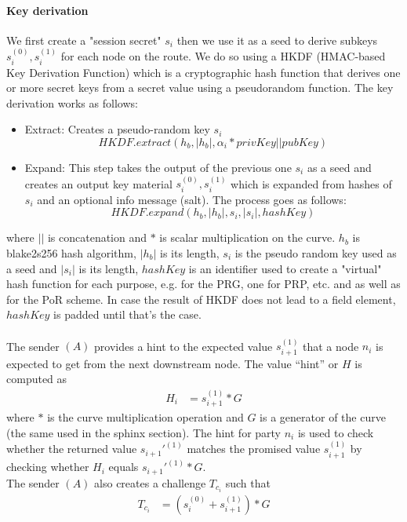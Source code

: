     \paragraph{Key derivation}
    We first create a "session secret" $s_i$ then we use it as a seed to derive subkeys $s_i^{(0)},s_i^{(1)}$ for each node on the route. We do so using a HKDF (HMAC-based Key Derivation Function) which is a cryptographic hash function that derives one or more secret keys from a secret value using a pseudorandom function. The key derivation works as follows:
    \begin{itemize}
        \item Extract: Creates a pseudo-random key $s_i$   
        $$HKDF.extract(h_b, |h_b|, \alpha_i* privKey || pubKey)$$   

        \item Expand: This step takes the output of the previous one $s_i$ as a seed and creates an output key material $s_i^{(0)},s_i^{(1)}$ which is expanded from hashes of $s_i$ and an optional info message (salt). The process goes as follows:
        $$HKDF.expand(h_b, |h_b|,s_i, |s_i|, hashKey)$$
    \end{itemize}
    where $||$ is concatenation and $*$ is scalar multiplication on the curve. $h_b$ is blake2s256 hash algorithm, $|h_b|$ is its length, $s_i$ is the pseudo random key used as a seed and $|s_i|$ is its length, $hashKey$ is an identifier used to create a "virtual" hash function for each purpose, e.g. for the PRG, one for PRP, etc. and as well as for the PoR scheme. In case the result of HKDF does not lead to a field element, $hashKey$ is padded until that's the case.
    \\~\\ The sender $(A)$ provides a hint to the expected value $s_{i+1}^{(1)}$ that a node $n_i$ is expected to get from the next downstream node.
    The value “hint” or $H$ is computed as 
    \begin{align}  
        H_i&=s_{i+1}^{(1)}*G
         \end{align}
    where $*$ is the curve multiplication operation and $G$ is a generator of the curve (the same used in the sphinx section). 
    \newline The hint for party $n_i$ is used to check whether the returned value $s_{i+1}'^{(1)}$ matches the promised value $s_{i+1}^{(1)}$ by checking whether $H_i$ equals $s_{i+1}'^{(1)}*G$. 
   \\The sender $(A)$ also creates a challenge $T_{c_i}$ such that 
   \begin{align}  
    T_{c_i}&=(s_i^{(0)}+s_{i+1}^{(1)})*G
     \end{align}
